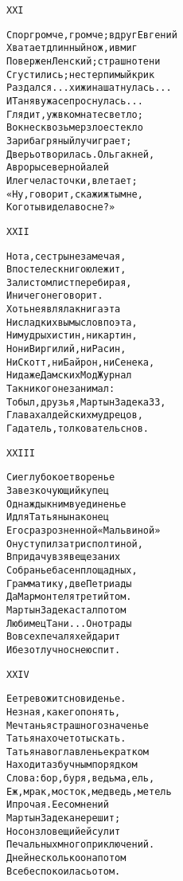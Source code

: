 \begin{minipage}[t]{\dimexpr 0.5\textwidth -\tabcolsep-.5pt}
\begin{alltt}\normalfont\centering
XXI

Спор громче, громче; вдруг Евгений
Хватает длинный нож, и вмиг
Повержен Ленский; страшно тени
Сгустились; нестерпимый крик
Раздался... хижина шатнулась...
И Таня в ужасе проснулась...
Глядит, уж в комнате светло;
В окне сквозь мерзлое стекло
Зари багряный луч играет;
Дверь отворилась. Ольга к ней,
Авроры северной алей
И легче ласточки, влетает;
«Ну, говорит, скажи ж ты мне,
Кого ты видела во сне?»
\end{alltt}
\end{minipage}

\begin{minipage}[t]{\dimexpr 0.5\textwidth -\tabcolsep-.5pt}
\begin{alltt}\normalfont\centering
XXII

Но та, сестры не замечая,
В постеле с книгою лежит,
За листом лист перебирая,
И ничего не говорит.
Хоть не являла книга эта
Ни сладких вымыслов поэта,
Ни мудрых истин, ни картин,
Но ни Виргилий, ни Расин,
Ни Скотт, ни Байрон, ни Сенека,
Ни даже Дамских Мод Журнал
Так никого не занимал:
То был, друзья, Мартын Задека 33,
Глава халдейских мудрецов,
Гадатель, толкователь снов.
\end{alltt}
\end{minipage}
\clearpage

\begin{minipage}[t]{\dimexpr 0.5\textwidth -\tabcolsep-.5pt}
\begin{alltt}\normalfont\centering
XXIII

Сие глубокое творенье
Завез кочующий купец
Однажды к ним в уединенье
И для Татьяны наконец
Его с разрозненной «Мальвиной»
Он уступил за три с полтиной,
В придачу взяв еще за них
Собранье басен площадных,
Грамматику, две Петриады
Да Мармонтеля третий том.
Мартын Задека стал потом
Любимец Тани... Он отрады
Во всех печалях ей дарит
И безотлучно с нею спит.
\end{alltt}
\end{minipage}

\begin{minipage}[t]{\dimexpr 0.5\textwidth -\tabcolsep-.5pt}
\begin{alltt}\normalfont\centering
XXIV

Ее тревожит сновиденье.
Не зная, как его понять,
Мечтанья страшного значенье
Татьяна хочет отыскать.
Татьяна в оглавленье кратком
Находит азбучным порядком
Слова: бор, буря, ведьма, ель,
Еж, мрак, мосток, медведь, метель
И прочая. Ее сомнений
Мартын Задека не решит;
Но сон зловещий ей сулит
Печальных много приключений.
Дней несколько она потом
Все беспокоилась о том.
\end{alltt}
\end{minipage}
\clearpage

